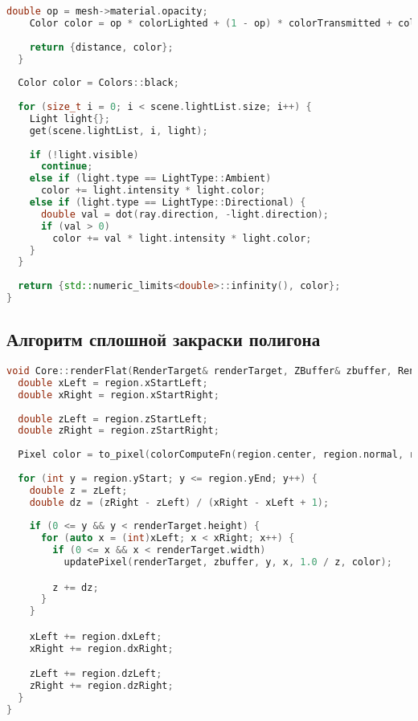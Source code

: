 \begin{lstlisting}[language=C++]
    double op = mesh->material.opacity;
    Color color = op * colorLighted + (1 - op) * colorTransmitted + colorReflected;
  
    return {distance, color};
  }
  
  Color color = Colors::black;
  
  for (size_t i = 0; i < scene.lightList.size; i++) {
    Light light{};
    get(scene.lightList, i, light);
    
    if (!light.visible)
      continue;
    else if (light.type == LightType::Ambient)
      color += light.intensity * light.color;
    else if (light.type == LightType::Directional) {
      double val = dot(ray.direction, -light.direction);
      if (val > 0)
        color += val * light.intensity * light.color;
    }
  }
  
  return {std::numeric_limits<double>::infinity(), color};
}
\end{lstlisting}

\subsection{Алгоритм сплошной закраски полигона}

\begin{lstlisting}[language=C++]
void Core::renderFlat(RenderTarget& renderTarget, ZBuffer& zbuffer, RenderRegion region, ColorComputeFn colorComputeFn) {
  double xLeft = region.xStartLeft;
  double xRight = region.xStartRight;
	
  double zLeft = region.zStartLeft;
  double zRight = region.zStartRight;
	
  Pixel color = to_pixel(colorComputeFn(region.center, region.normal, region.meshPtr->material));
	
  for (int y = region.yStart; y <= region.yEnd; y++) {
    double z = zLeft;
    double dz = (zRight - zLeft) / (xRight - xLeft + 1);
		
    if (0 <= y && y < renderTarget.height) {
      for (auto x = (int)xLeft; x < xRight; x++) {
        if (0 <= x && x < renderTarget.width)
          updatePixel(renderTarget, zbuffer, y, x, 1.0 / z, color);

        z += dz;
      }
    }

    xLeft += region.dxLeft;
    xRight += region.dxRight;

    zLeft += region.dzLeft;
    zRight += region.dzRight;
  }
}
\end{lstlisting}
